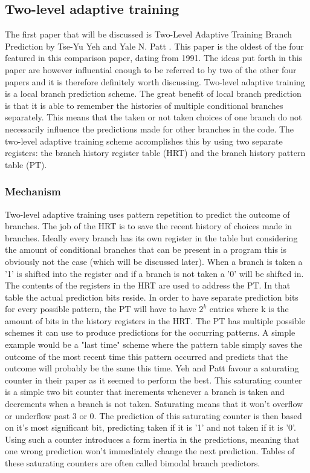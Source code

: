 \subsection{Two-level adaptive training}
The first paper that will be discussed is Two-Level Adaptive Training Branch Prediction by Tse-Yu Yeh and Yale N. Patt \cite{twolevel}. This paper is the oldest of the four featured in this comparison paper, dating from 1991. The ideas put forth in this paper are however influential enough to be referred to by two of the other four papers and it is therefore definitely worth discussing. Two-level adaptive training is a local branch prediction scheme. The great benefit of local branch prediction is that it is able to remember the histories of multiple conditional branches separately. This means that the taken or not taken choices of one branch do not necessarily influence the predictions made for other branches in the code. The two-level adaptive training scheme accomplishes this by using two separate registers: the branch history register table (HRT) and the branch history pattern table (PT).
\subsubsection{Mechanism}
Two-level adaptive training uses pattern repetition to predict the outcome of branches. The job of the HRT is to save the recent history of choices made in branches. Ideally every branch has its own register in the table but considering the amount of conditional branches that can be present in a program this is obviously not the case (which will be discussed later). When a branch is taken a '1' is shifted into the register and if a branch is not taken a '0' will be shifted in. The contents of the registers in the HRT are used to address the PT. In that table the actual prediction bits reside. In order to have separate prediction bits for every possible pattern, the PT will have to have $2^k$ entries where k is the amount of bits in the history registers in the HRT. The PT has multiple possible schemes it can use to produce predictions for the occurring patterns. A simple example would be a "last time" scheme where the pattern table simply saves the outcome of the most recent time this pattern occurred and predicts that the outcome will probably be the same this time. Yeh and Patt favour a saturating counter in their paper as it seemed to perform the best. This saturating counter is a simple two bit counter that increments whenever a branch is taken and decrements when a branch is not taken. Saturating means that it won't overflow or underflow past 3 or 0. The prediction of this saturating counter is then based on it's most significant bit, predicting taken if it is '1' and not taken if it is '0'. Using such a counter introduces a form inertia in the predictions, meaning that one wrong prediction won't immediately change the next prediction. Tables of these saturating counters are often called bimodal branch predictors.
